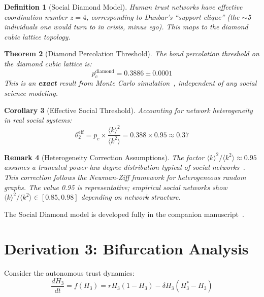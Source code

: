 \documentclass[11pt,twocolumn]{article}
\newtheorem{theorem}{Theorem}[section]
\newtheorem{corollary}[theorem]{Corollary}
\newtheorem{definition}[theorem]{Definition}
\newtheorem{remark}[theorem]{Remark}
\begin{document}
\begin{definition}[Social Diamond Model]
Human trust networks have effective coordination number $z = 4$, corresponding to Dunbar's ``support clique'' (the $\sim$5 individuals one would turn to in crisis, minus ego). This maps to the diamond cubic lattice topology.
\end{definition}

\begin{theorem}[Diamond Percolation Threshold]
\label{thm:diamond}
The bond percolation threshold on the diamond cubic lattice is:
\begin{equation}
p_c^{\text{diamond}} = 0.3886 \pm 0.0001
\end{equation}
This is an \textbf{exact} result from Monte Carlo simulation~\cite{Lorenz1998}, independent of any social science modeling.
\end{theorem}

\begin{corollary}[Effective Social Threshold]
Accounting for network heterogeneity in real social systems:
\begin{equation}
\theta_2^{\text{eff}} = p_c \times \frac{\langle k \rangle^2}{\langle k^2 \rangle} = 0.388 \times 0.95 \approx \mathbf{0.37}
\end{equation}
\end{corollary}

\begin{remark}[Heterogeneity Correction Assumptions]
The factor $\langle k \rangle^2 / \langle k^2 \rangle \approx 0.95$ assumes a truncated power-law degree distribution typical of social networks~\cite{Dunbar1992}. This correction follows the Newman-Ziff framework for heterogeneous random graphs. The value 0.95 is representative; empirical social networks show $\langle k \rangle^2 / \langle k^2 \rangle \in [0.85, 0.98]$ depending on network structure.
\end{remark}

The Social Diamond model is developed fully in the companion manuscript~\cite{SocialDiamond}.

\section{Derivation 3: Bifurcation Analysis}

Consider the autonomous trust dynamics:
\begin{equation}
\frac{dH_3}{dt} = f(H_3) = rH_3(1 - H_3) - \delta H_3(H_3^* - H_3)
\end{equation}
\end{document}

